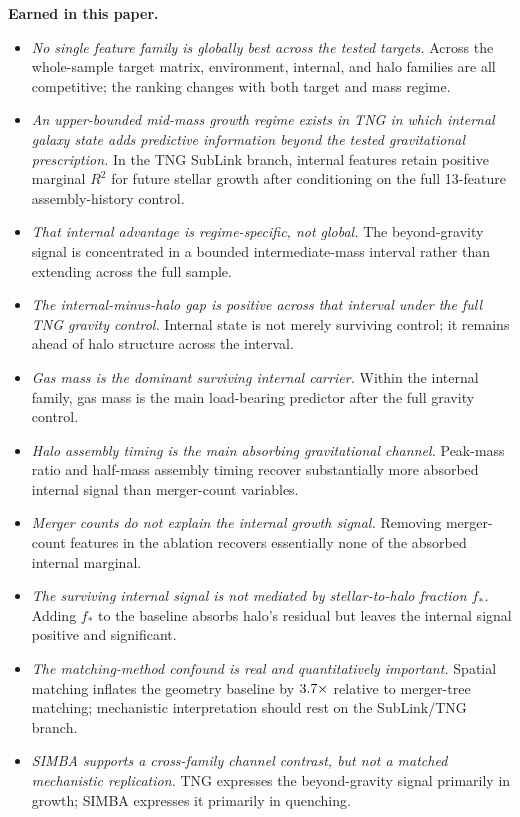 \documentclass[twocolumn,linenumbers]{aastex701}
\newcommand{\fstar}{f_*}
\begin{document}
\noindent\textbf{Earned in this paper.}
\begin{itemize}[leftmargin=*,itemsep=2pt]
  \item \textit{No single feature family is globally best across the tested
    targets.}  Across the whole-sample target matrix, environment, internal,
    and halo families are all competitive; the ranking changes with both
    target and mass regime.

  \item \textit{An upper-bounded mid-mass growth regime exists in TNG in which
    internal galaxy state adds predictive information beyond the tested
    gravitational prescription.}  In the TNG SubLink branch, internal features
    retain positive marginal $R^2$ for future stellar growth after conditioning
    on the full 13-feature assembly-history control.

  \item \textit{That internal advantage is regime-specific, not global.}
    The beyond-gravity signal is concentrated in a bounded intermediate-mass
    interval rather than extending across the full sample.

  \item \textit{The internal-minus-halo gap is positive across that interval
    under the full TNG gravity control.}  Internal state is not merely
    surviving control; it remains ahead of halo structure across the interval.

  \item \textit{Gas mass is the dominant surviving internal carrier.}
    Within the internal family, gas mass is the main load-bearing predictor
    after the full gravity control.

  \item \textit{Halo assembly timing is the main absorbing gravitational
    channel.}  Peak-mass ratio and half-mass assembly timing recover
    substantially more absorbed internal signal than merger-count variables.

  \item \textit{Merger counts do not explain the internal growth signal.}
    Removing merger-count features in the ablation recovers essentially none
    of the absorbed internal marginal.

  \item \textit{The surviving internal signal is not mediated by stellar-to-halo
    fraction $\fstar$.}  Adding $\fstar$ to the baseline absorbs halo's residual
    but leaves the internal signal positive and significant.

  \item \textit{The matching-method confound is real and quantitatively
    important.}  Spatial matching inflates the geometry baseline by
    $3.7\times$ relative to merger-tree matching; mechanistic
    interpretation should rest on the SubLink/TNG branch.

  \item \textit{SIMBA supports a cross-family channel contrast, but not a
    matched mechanistic replication.}  TNG expresses the beyond-gravity signal
    primarily in growth; SIMBA expresses it primarily in quenching.
\end{itemize}
\end{document}
